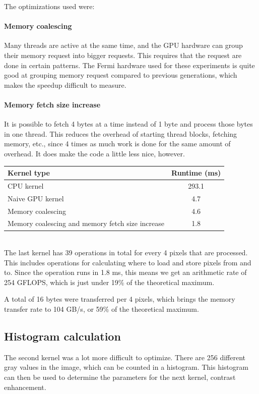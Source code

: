 \documentclass[11pt,a4paper]{article}
\begin{document}
The optimizations used were:
\paragraph{Memory coalescing}
Many threads are active at the same time, and the GPU hardware can group their memory request into bigger requests. This requires that the request are done in certain patterns. The Fermi hardware used for these experiments is quite good at grouping memory request compared to previous generations, which makes the speedup difficult to measure.

\paragraph{Memory fetch size increase}
It is possible to fetch 4 bytes at a time instead of 1 byte and process those bytes in one thread. This reduces the overhead of starting thread blocks, fetching memory, etc., since 4 times as much work is done for the same amount of overhead. It does make the code a little less nice, however. \\

\begin{tabular}{ | l | S | }
	\hline
	\textbf{Kernel type} & \textbf{Runtime (ms)} \\
	\hline                       
	CPU kernel & 293.1 \\
	\hline
	Naive GPU kernel & 4.7 \\
	\hline
	Memory coalescing & 4.6 \\
	\hline
	Memory coalescing and memory fetch size increase & 1.8 \\
	\hline
\end{tabular} \\

The last kernel has 39 operations in total for every 4 pixels that are processed. This includes operations for calculating where to load and store pixels from and to. Since the operation runs in 1.8 ms, this means we get an arithmetic rate of 254 GFLOPS, which is just under 19\% of the theoretical maximum.

A total of 16 bytes were transferred per 4 pixels, which brings the memory transfer rate to 104 GB/s, or 59\% of the theoretical maximum.

\subsection{Histogram calculation}
The second kernel was a lot more difficult to optimize. There are 256 different gray values in the image, which can be counted in a histogram. This histogram can then be used to determine the parameters for the next kernel, contrast enhancement.
\end{document}
